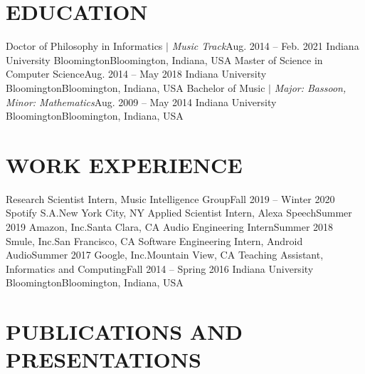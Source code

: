 \section*{EDUCATION}
  \CVSubHeadingListStart
    \CVSubheading
      {{Doctor of Philosophy in Informatics $|$ \emph{\small{Music Track}}}}{Aug. 2014 -- Feb. 2021}
      {Indiana University Bloomington}{Bloomington, Indiana, USA}
    \CVSubheading
      {Master of Science in Computer Science}{Aug. 2014 -- May 2018}
      {Indiana University Bloomington}{Bloomington, Indiana, USA}
    \CVSubheading
      {{Bachelor of Music $|$ \emph{\small{Major: Bassoon, Minor: Mathematics}}}}{Aug. 2009 -- May 2014}
      {Indiana University Bloomington}{Bloomington, Indiana, USA}
  \CVSubHeadingListEnd


\section*{WORK EXPERIENCE}
  \CVSubHeadingListStart
  
    \CVSubheading
      {Research Scientist Intern, Music Intelligence Group}{Fall 2019 -- Winter 2020}
      {Spotify S.A.}{New York City, NY}
    \CVSubheading
      {Applied Scientist Intern, Alexa Speech}{Summer 2019}
      {Amazon, Inc.}{Santa Clara, CA}
    \CVSubheading
      {Audio Engineering Intern}{Summer 2018}
      {Smule, Inc.}{San Francisco, CA}
    \CVSubheading
      {Software Engineering Intern, Android Audio}{Summer 2017}
      {Google, Inc.}{Mountain View, CA}
    \CVSubheading
      {Teaching Assistant, Informatics and Computing}{Fall 2014 -- Spring 2016}
      {Indiana University Bloomington}{Bloomington, Indiana, USA}
  \CVSubHeadingListEnd



\section*{PUBLICATIONS AND PRESENTATIONS}

